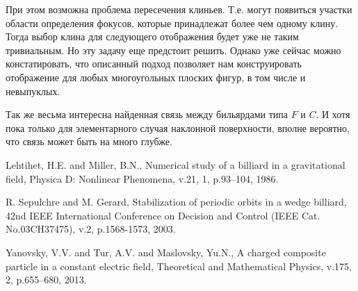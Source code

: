 \documentclass[a4paper]{article}
\begin{document}


При этом возможна проблема пересечения клиньев. Т.е. могут появиться участки области определения фокусов, которые принадлежат более чем одному клину. Тогда выбор клина для следующего отображения будет уже не таким тривиальным. Но эту задачу еще предстоит решить. Однако уже сейчас можно констатировать, что описанный подход позволяет нам конструировать отображение для любых многоугольных плоских фигур, в том числе и невыпуклых.

Так же весьма интересна найденная связь между бильярдами типа $F$ и $C$. И хотя пока только для элементарного случая наклонной поверхности, вполне вероятно, что связь может быть на много глубже.

\begin{thebibliography}{31}
 Lehtihet, H.E. and Miller, B.N., Numerical study of a billiard in a gravitational field, Physica D: Nonlinear Phenomena, v.21, 1, p.93--104, 1986.

 R. Sepulchre and M. Gerard, Stabilization of periodic orbits in a wedge billiard, 42nd IEEE International Conference on Decision and Control (IEEE Cat. No.03CH37475), v.2, p.1568-1573, 2003.

 Yanovsky, V.V. and Tur, A.V. and Maslovsky, Yu.N., A charged composite particle in a constant electric field, Theoretical and Mathematical Physics, v.175, 2, p.655--680, 2013.









\end{thebibliography}
\end{document}
